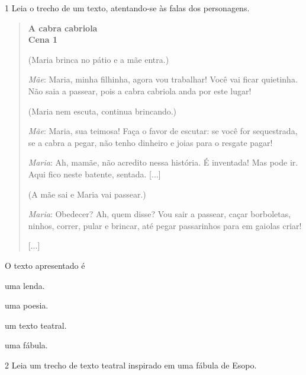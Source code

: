 \num{1} Leia o trecho de um texto, atentando-se às falas dos personagens.

\begin{quote}
\textbf{A cabra cabriola}\\
\textbf{Cena 1}

(Maria brinca no pátio e a mãe entra.)

\emph{Mãe}: Maria, minha filhinha, agora vou trabalhar! Você vai ficar
quietinha. Não saia a passear, pois a cabra cabriola anda por este
lugar!

(Maria nem escuta, continua brincando.)

\emph{Mãe}: Maria, sua teimosa! Faça o favor de escutar: se você for
sequestrada, se a cabra a pegar, não tenho dinheiro e joias para o
resgate pagar!

\emph{Maria}: Ah, mamãe, não acredito nessa história. É inventada! Mas
pode ir. Aqui fico neste batente, sentada. {[}...{]}

(A mãe sai e Maria vai passear.)

\emph{Maria}: Obedecer? Ah, quem disse? Vou sair a passear, caçar
borboletas, ninhos, correr, pular e brincar, até pegar passarinhos para
em gaiolas criar!

{[}...{]}

\end{quote}

O texto apresentado é

\begin{escolha}[itemsep=-5pt]
\item uma lenda.

\item uma poesia.

\item um texto teatral.

\item uma fábula.
\end{escolha}



\num{2} Leia um trecho de texto teatral inspirado em uma fábula de Esopo.

